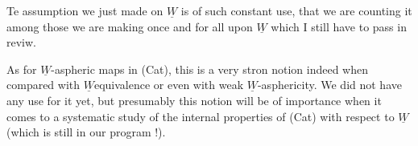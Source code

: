Te assumption we just made on $\underline{W}$ is of such constant use,  that we
are counting it among those we are making once and for all upon $\underline{W}$ 
\hand{(}which I still have to pass in reviw\hand{)}.

As for $\underline{W}$-aspheric maps in (Cat),  this is a very stron notion indeed
when compared with $\underline{W}$\hand{-}equivalence or even with weak $\underline{W}$-asphericity.  We
did not have any use for it yet,  but presumably this notion will be of
importance when it comes to a systematic study of the internal properties
of (Cat) with respect to $\underline{W}$ (which is still in our program !).

